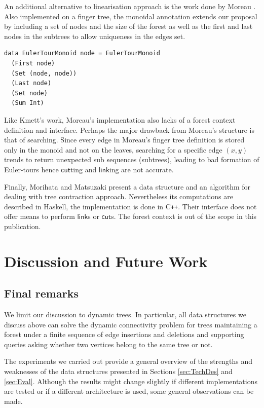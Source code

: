 \documentclass{elsarticle}
\newcommand{\MATHSF}[1]{\ensuremath{\mathsf{#1}}\xspace}
\newcommand{\link}{\MATHSF{link}}
\newcommand{\cut}{\MATHSF{cut}}
\begin{document}
An additional alternative to linearisation approach is the work done by Moreau \cite{HaskellET}. Also implemented on a finger tree, the monoidal annotation extends our proposal by including a set of nodes and the size of the forest as well as the first and last nodes in the subtrees to allow uniqueness in the edges set.
\begin{lstlisting}[mathescape]
data EulerTourMonoid node = EulerTourMonoid
  (First node)
  (Set (node, node))
  (Last node)
  (Set node)
  (Sum Int)
\end{lstlisting} 

Like Kmett's work, Moreau's implementation also lacks of a forest context definition and interface. Perhaps the major  drawback from Moreau's structure is that of searching. Since every edge in Moreau's finger tree definition is stored only in the monoid and not on the leaves, searching for a specific edge $(x,y)$ trends to return unexpected sub sequences (subtrees), leading to bad formation of Euler-tours hence {\cut}ting and {\link}ing are not accurate.

Finally, Morihata and Matsuzaki \cite{TreeContraction} present a data structure and an algorithm for dealing with tree contraction approach. Nevertheless its computations are described in Haskell, the implementation is done in C\texttt{++}. Their interface does not offer means to perform {\link}s or {\cut}s. The forest context is out of the scope in this publication.


\section{Discussion and Future Work} 
\label{sec:Concl} 
\label{sec:discussion}

\subsection{Final remarks}

We limit our discussion to dynamic trees. In particular, all data structures we discuss above can solve the dynamic connectivity problem for trees maintaining a forest under a finite sequence of edge insertions and deletions and supporting queries asking whether two vertices belong to the same tree or not.

The experiments we carried out provide a general overview of the strengths and weaknesses of the data structures presented in Sections \ref{sec:TechDes} and \ref{sec:Eval}. Although the results might change slightly if different implementations are tested or if a different architecture is used, some general observations can be made.
\end{document}
